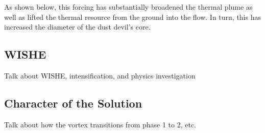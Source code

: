 As shown below, this forcing has substantially broadened the thermal
plume as well as lifted the thermal resource from the ground into the
flow. In turn, this has increased the diameter of the dust devil's
core. 


%
%

\subsection{WISHE}

Talk about WISHE, intensification, and physics investigation

\subsection{Character of the Solution}

Talk about how the vortex transitions from phase 1 to 2, etc. 
